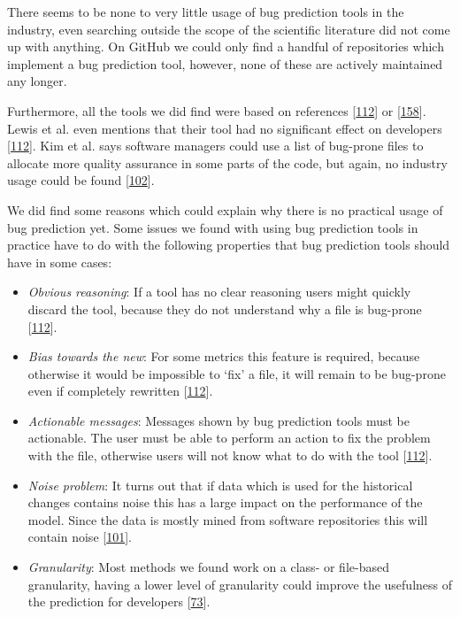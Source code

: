 \documentclass[]{book}
\providecommand{\tightlist}{%
  \setlength{\itemsep}{0pt}\setlength{\parskip}{0pt}}
\begin{document}
There seems to be none to very little usage of bug prediction tools in
the industry, even searching outside the scope of the scientific
literature did not come up with anything. On GitHub we could only find a
handful of repositories which implement a bug prediction tool, however,
none of these are actively maintained any longer.

Furthermore, all the tools we did find were based on references
{[}\protect\hyperlink{ref-Lewis2013}{112}{]} or
{[}\protect\hyperlink{ref-rahman2011}{158}{]}. Lewis et al. even
mentions that their tool had no significant effect on developers
{[}\protect\hyperlink{ref-Lewis2013}{112}{]}. Kim et al. says software
managers could use a list of bug-prone files to allocate more quality
assurance in some parts of the code, but again, no industry usage could
be found {[}\protect\hyperlink{ref-kim2007}{102}{]}.

We did find some reasons which could explain why there is no practical
usage of bug prediction yet. Some issues we found with using bug
prediction tools in practice have to do with the following properties
that bug prediction tools should have in some cases:

\begin{itemize}
\tightlist
\item
  \emph{Obvious reasoning}: If a tool has no clear reasoning users might
  quickly discard the tool, because they do not understand why a file is
  bug-prone {[}\protect\hyperlink{ref-Lewis2013}{112}{]}.
\item
  \emph{Bias towards the new}: For some metrics this feature is
  required, because otherwise it would be impossible to `fix' a file, it
  will remain to be bug-prone even if completely rewritten
  {[}\protect\hyperlink{ref-Lewis2013}{112}{]}.
\item
  \emph{Actionable messages}: Messages shown by bug prediction tools
  must be actionable. The user must be able to perform an action to fix
  the problem with the file, otherwise users will not know what to do
  with the tool {[}\protect\hyperlink{ref-Lewis2013}{112}{]}.
\item
  \emph{Noise problem}: It turns out that if data which is used for the
  historical changes contains noise this has a large impact on the
  performance of the model. Since the data is mostly mined from software
  repositories this will contain noise
  {[}\protect\hyperlink{ref-Kim2011}{101}{]}.
\item
  \emph{Granularity}: Most methods we found work on a class- or
  file-based granularity, having a lower level of granularity could
  improve the usefulness of the prediction for developers
  {[}\protect\hyperlink{ref-giger2012}{73}{]}.
\end{itemize}
\end{document}
